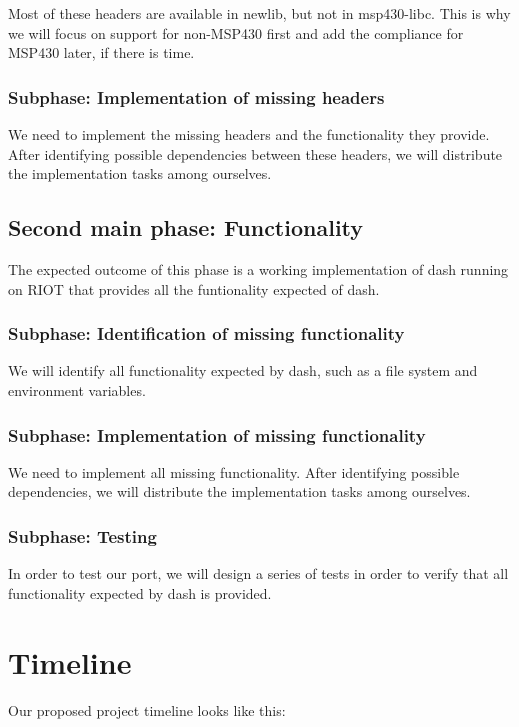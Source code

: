\documentclass[11pt,
  a4paper,
  BCOR=7mm
]{scrartcl}
\begin{document}
Most of these headers are available in newlib, but not in msp430-libc.
This is why we will focus on support for non-MSP430 first and add the compliance
for MSP430 later, if there is time.

\subsubsection*{Subphase: Implementation of missing headers}
\label{ssub:headers_implementation}
We need to implement the missing headers and the functionality they
provide. After identifying possible dependencies between these headers,
we will distribute the implementation tasks among ourselves.

\subsection*{Second main phase: Functionality}
\label{sub:functionality}
The expected outcome of this phase is a working implementation of dash
running on RIOT that provides all the funtionality expected of dash.

\subsubsection*{Subphase: Identification of missing functionality}
\label{ssub:functionality_identification}
We will identify all functionality expected by dash, such as a file
system and environment variables.

\subsubsection*{Subphase: Implementation of missing functionality}
\label{ssub:functionality_implementation}
We need to implement all missing functionality. After identifying
possible dependencies, we will distribute the implementation tasks among
ourselves.

\subsubsection*{Subphase: Testing}
\label{ssub:testing}
In order to test our port, we will design a series of tests in order to
verify that all functionality expected by dash is provided.


\section*{Timeline}
\label{sec:timeline}
Our proposed project timeline looks like this:
\newline
\end{document}
